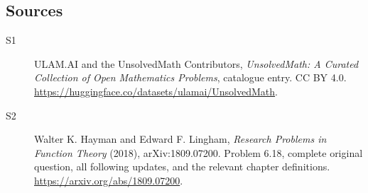 \documentclass[11pt]{book}
\begin{document}
\subsection{Sources}
\begin{description}
\item[\hypertarget{source:statement:1}{S1}] ULAM.AI and the UnsolvedMath Contributors, \emph{UnsolvedMath: A Curated Collection of Open Mathematics Problems}, catalogue entry. CC BY 4.0. \url{https://huggingface.co/datasets/ulamai/UnsolvedMath}.
\item[\hypertarget{source:statement:2}{S2}] Walter K. Hayman and Edward F. Lingham, \emph{Research Problems in Function Theory} (2018), arXiv:1809.07200. Problem 6.18, complete original question, all following updates, and the relevant chapter definitions. \url{https://arxiv.org/abs/1809.07200}.
\end{description}
\label{end:statement}
\end{document}
